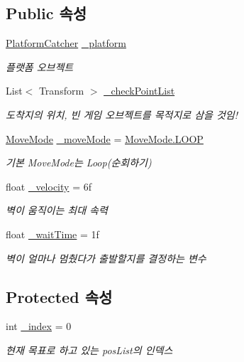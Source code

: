 \subsection*{Public 속성}
\begin{DoxyCompactItemize}
\item 
\mbox{\hyperlink{class_platform_catcher}{Platform\+Catcher}} \mbox{\hyperlink{class_moving_platform_a2269ebd689de9ad6368f64b6b14cecb6}{\+\_\+platform}}
\begin{DoxyCompactList}\small\item\em 플랫폼 오브젝트 \end{DoxyCompactList}\item 
List$<$ Transform $>$ \mbox{\hyperlink{class_moving_platform_aa67781ca68fc140906aa309c82f0d349}{\+\_\+check\+Point\+List}}
\begin{DoxyCompactList}\small\item\em 도착지의 위치, 빈 게임 오브젝트를 목적지로 삼을 것임! \end{DoxyCompactList}\item 
\mbox{\hyperlink{class_moving_platform_a7b3427d2906069ecf4c39d69eee53653}{Move\+Mode}} \mbox{\hyperlink{class_moving_platform_a47308284bdf720a8fe919a69f2c0019b}{\+\_\+move\+Mode}} = \mbox{\hyperlink{class_moving_platform_a7b3427d2906069ecf4c39d69eee53653a9159b3578e4e1eb31ffdf90acd6f6e40}{Move\+Mode.\+L\+O\+OP}}
\begin{DoxyCompactList}\small\item\em 기본 Move\+Mode는 Loop(순회하기) \end{DoxyCompactList}\item 
float \mbox{\hyperlink{class_moving_platform_a831cd24df75aa37f0897741d189686a7}{\+\_\+velocity}} = 6f
\begin{DoxyCompactList}\small\item\em 벽이 움직이는 최대 속력 \end{DoxyCompactList}\item 
float \mbox{\hyperlink{class_moving_platform_af1a2156a73b89603147dc4009679c738}{\+\_\+wait\+Time}} = 1f
\begin{DoxyCompactList}\small\item\em 벽이 얼마나 멈췄다가 출발할지를 결정하는 변수 \end{DoxyCompactList}\end{DoxyCompactItemize}
\subsection*{Protected 속성}
\begin{DoxyCompactItemize}
\item 
int \mbox{\hyperlink{class_moving_platform_a20948e50a50c338c4e62f84a633868ac}{\+\_\+index}} = 0
\begin{DoxyCompactList}\small\item\em 현재 목표로 하고 있는 pos\+List의 인덱스 \end{DoxyCompactList}\end{DoxyCompactItemize}
